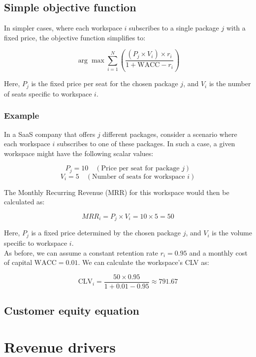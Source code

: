 \documentclass{article}
\begin{document}
\subsection{Simple objective function}

In simpler cases, where each workspace \( i \) subscribes to a single package \( j \) with a fixed price, the objective function simplifies to:

\begin{equation}
\arg\max \sum_{i=1}^{N} \left( \frac{(P_j \times V_i) \times r_i}{1 + \text{WACC} - r_i} \right)
\end{equation}

Here, \( P_j \) is the fixed price per seat for the chosen package \( j \), and \( V_i \) is the number of seats specific to workspace \( i \). 

\subsubsection{Example}

In a SaaS company that offers \( j \) different packages, consider a scenario where each workspace \( i \) subscribes to one of these packages. In such a case, a  given workspace might have the following scalar values:

\[
P_j = 10 \quad (\text{Price per seat for package } j)
\]
\[
V_i = 5 \quad (\text{Number of seats for workspace } i)
\]

The Monthly Recurring Revenue (MRR) for this workspace would then be calculated as:

\[
MRR_i = P_j \times V_i = 10 \times 5 = 50
\]

Here, \( P_j \) is a fixed price determined by the chosen package \( j \), and \( V_i \) is the volume specific to workspace \( i \). \\

As before, we can assume a constant retention rate \( r_i = 0.95 \) and a monthly cost of capital \( \text{WACC} = 0.01 \). We can calculate the workspace's CLV as:

\[
\text{CLV}_i = \frac{50 \times 0.95}{1 + 0.01 - 0.95} \approx 791.67
\]


\subsection{Customer equity equation}

\section{Revenue drivers}
\end{document}
